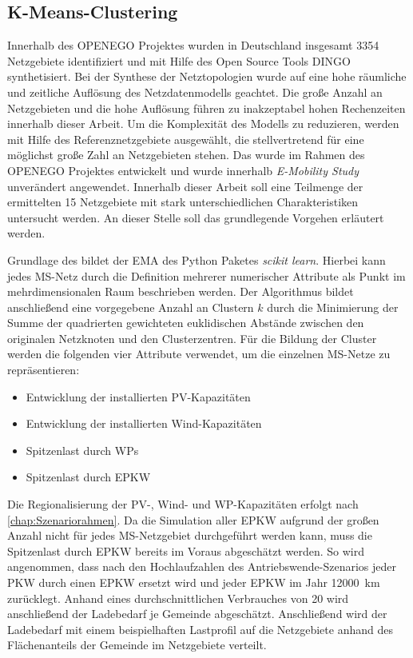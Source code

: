 \subsection{K-Means-Clustering}

Innerhalb des \gls{OPENEGO} Projektes \cite{Mueller2019} wurden in Deutschland insgesamt {\color{red} \num{3354}} Netzgebiete identifiziert und mit Hilfe des Open Source Tools \gls{DINGO} synthetisiert.
Bei der Synthese der Netztopologien wurde auf eine hohe räumliche und zeitliche Auflösung des Netzdatenmodells geachtet.
Die große Anzahl an Netzgebieten und die hohe Auflösung führen zu inakzeptabel hohen Rechenzeiten innerhalb dieser Arbeit.
Um die Komplexität des Modells zu reduzieren, werden mit Hilfe des \kmeans Referenznetzgebiete ausgewählt, die stellvertretend für eine möglichst große Zahl an Netzgebieten stehen.
Das \kmean wurde im Rahmen des \gls{OPENEGO} Projektes \cite{Mueller2019} entwickelt und wurde innerhalb \textit{E-Mobility Study} \cite{Schachler} unverändert angewendet.
Innerhalb dieser Arbeit soll eine Teilmenge der ermittelten \num{15} Netzgebiete mit stark unterschiedlichen Charakteristiken untersucht werden.
An dieser Stelle soll das grundlegende Vorgehen erläutert werden. \medskip

Grundlage des \kmeans bildet der \gls{EMA} des Python Paketes \textit{scikit learn}. \cite{scikit-learn2011}
Hierbei kann jedes \gls{MS}-Netz durch die Definition mehrerer numerischer Attribute als Punkt im mehrdimensionalen Raum beschrieben werden.
Der Algorithmus bildet anschließend eine vorgegebene Anzahl an Clustern $k$ durch die Minimierung der Summe der quadrierten gewichteten euklidischen Abstände zwischen den originalen Netzknoten und den Clusterzentren.
Für die Bildung der Cluster werden die folgenden vier Attribute verwendet, um die einzelnen \gls{MS}-Netze zu repräsentieren:

\begin{itemize}
	\item Entwicklung der installierten \gls{PV}-Kapazitäten
	\item Entwicklung der installierten Wind-Kapazitäten
	\item Spitzenlast durch \glspl{WP}
	\item Spitzenlast durch \gls{EPKW}
\end{itemize}

Die Regionalisierung der \gls{PV}-, Wind- und \gls{WP}-Kapazitäten erfolgt nach \autoref{chap:Szenariorahmen}.
Da die Simulation aller \gls{EPKW} aufgrund der großen Anzahl nicht für jedes \gls{MS}-Netzgebiet durchgeführt werden kann, muss die Spitzenlast durch \gls{EPKW} bereits im Voraus abgeschätzt werden.
So wird angenommen, dass nach den Hochlaufzahlen des Antriebswende-Szenarios jeder \gls{PKW} durch einen \gls{EPKW} ersetzt wird und jeder \gls{EPKW} im Jahr \SI{12000}{\km} zurücklegt.
Anhand eines durchschnittlichen Verbrauches von \SI{20}{\kwhkm} wird anschließend der Ladebedarf je Gemeinde abgeschätzt.
Anschließend wird der Ladebedarf mit einem beispielhaften Lastprofil auf die Netzgebiete anhand des Flächenanteils der Gemeinde im Netzgebiete verteilt.\medskip


